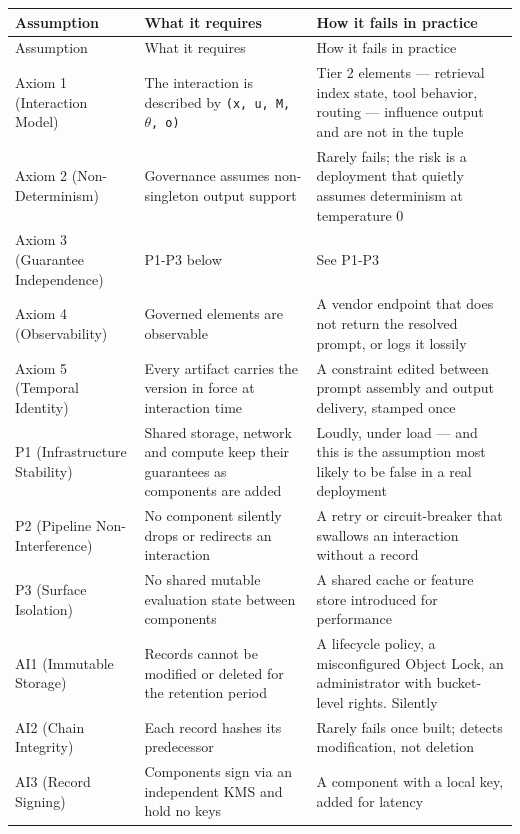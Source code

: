 \small
\begin{longtable}{@{}>{\raggedright\arraybackslash}p{2.14cm}>{\raggedright\arraybackslash}p{5.26cm}>{\raggedright\arraybackslash}p{6.95cm}@{}}
  \toprule
  Assumption & What it requires & How it fails in practice \\
  \midrule
\endfirsthead
  \toprule
  Assumption & What it requires & How it fails in practice \\
  \midrule
\endhead
  \bottomrule
\endlastfoot
  Axiom 1 (Interaction Model) & The interaction is described by \texttt{(x, u, M, $\theta$, o)} & Tier 2 elements --- retrieval index state, tool behavior, routing --- influence output and are not in the tuple \\
  Axiom 2 (Non-Determinism) & Governance assumes non-singleton output support & Rarely fails; the risk is a deployment that quietly assumes determinism at temperature 0 \\
  Axiom 3 (Guarantee Independence) & P1-P3 below & See P1-P3 \\
  Axiom 4 (Observability) & Governed elements are observable & A vendor endpoint that does not return the resolved prompt, or logs it lossily \\
  Axiom 5 (Temporal Identity) & Every artifact carries the version in force at interaction time & A constraint edited between prompt assembly and output delivery, stamped once \\
  P1 (Infrastructure Stability) & Shared storage, network and compute keep their guarantees as components are added & Loudly, under load --- and this is the assumption most likely to be false in a real deployment \\
  P2 (Pipeline Non-Interference) & No component silently drops or redirects an interaction & A retry or circuit-breaker that swallows an interaction without a record \\
  P3 (Surface Isolation) & No shared mutable evaluation state between components & A shared cache or feature store introduced for performance \\
  AI1 (Immutable Storage) & Records cannot be modified or deleted for the retention period & A lifecycle policy, a misconfigured Object Lock, an administrator with bucket-level rights. Silently \\
  AI2 (Chain Integrity) & Each record hashes its predecessor & Rarely fails once built; detects modification, not deletion \\
  AI3 (Record Signing) & Components sign via an independent KMS and hold no keys & A component with a local key, added for latency \\

\end{longtable}
